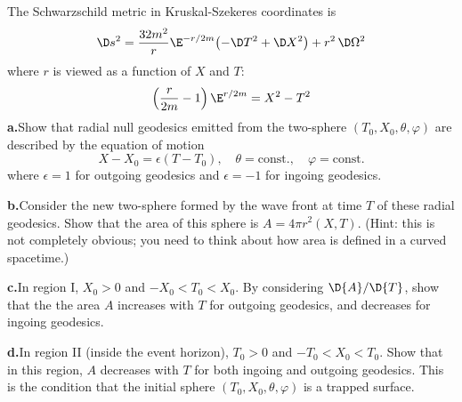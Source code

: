 \begin{exercises}
\begin{xca}
The Schwarzschild metric in Kruskal-Szekeres coordinates is
\begin{equation}
\D s^{2} =
\frac{32m^{2}}{r}\E^{-r/2m}
\bigl(-\D T^{2}+\D X^{2}\bigr)
 + r^2 \,\D\Omega^2
\end{equation}
where $r$ is viewed as a function of $X$ and $T$: 
\[
\left(\frac{r}{2m}-1\right)\E^{r/2m}=X^{2}-T^{2}
\]
\noindent\textbf{a.\quad}\ignorespaces Show that radial null
geodesics emitted from the two-sphere $(T_{0}, X_{0}, \theta,
\varphi)$ are described by the equation of motion
\begin{equation}
X - X_{0} = \epsilon(T - T_{0}),\quad
\theta=\mbox{const.},\quad\varphi=\mbox{const.}
\end{equation}
where $\epsilon=1$ for outgoing geodesics and $\epsilon=-1$ for
ingoing geodesics.

\noindent\textbf{b.\quad}\ignorespaces Consider the new
two-sphere formed by the wave front at time $T$ of these radial
geodesics. Show that the area of this sphere is $A =
4\pi{r^{2}(X, T )}$. (Hint: this is not completely obvious; you
need to think about how area is defined in a curved spacetime.)

\noindent\textbf{c.\quad}\ignorespaces In region I, $X_{0}>0$ and
$-X_{0}<T_{0}<X_{0}$. By considering $\D{A}/\D{T}$, show that the
the area $A$ increases with $T$ for outgoing geodesics, and
decreases for ingoing geodesics. 

\noindent\textbf{d.\quad}\ignorespaces In region II (inside the
event horizon), $T_{0}>0$ and $-T_{0}<X_{0}<T_{0}$. Show that in
this region, $A$ decreases with $T$ for both ingoing and outgoing
geodesics. This is the condition that the initial sphere $(T_{0},
X_{0}, \theta, \varphi)$ is a trapped surface. 
\end{xca}
\end{exercises}


